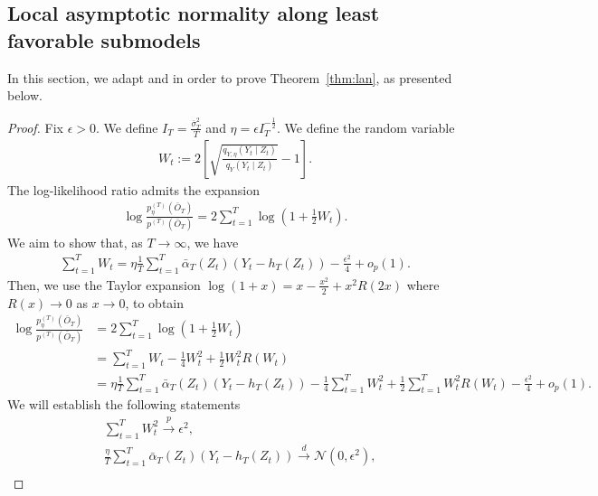 \documentclass[11pt]{article}
\begin{document}
\subsection{Local asymptotic normality along least favorable submodels}
\label{subsection: LAN}
In this section, we adapt \citet[Theorem 7.2]{vanderVaart1998asymptotic} and \citet[Theorem 17]{vanderlaan2026nonparametricinstrumentalvariableinference} in order to prove Theorem~\ref{thm:lan}, as presented below.
\begin{proof}
Fix $\epsilon >0$. We define $I_T = \frac{\bar{\sigma}_T^2}{T}$ and $\eta = \epsilon I_T^{-\frac{1}{2}}$. We define the random variable
    \begin{align*}
        W_t := 2\left[\sqrt{\frac{q_{Y, \eta}(Y_t\mid Z_t)}{q_{Y}(Y_t\mid Z_t)}} - 1\right]. 
    \end{align*}
    The log-likelihood ratio admits the expansion
    \begin{align*}
        \log \frac{p_{\eta}^{(T)}(\bar{O}_T)}{p^{(T)}(\bar{O}_T)} = 2\sum_{t=1}^{T}\log\left(1 + \frac{1}{2}W_t\right). 
    \end{align*}
    We aim to show that, as $T\to \infty$, we have
    \begin{align}
    \label{eq: wt_sum_prob}
        \sum_{t=1}^{T}W_t = \eta \frac{1}{T}\sum_{t=1}^{T}\bar{\alpha}_T(Z_t)(Y_t - h_T(Z_t)) - \frac{\epsilon^2}{4} + o_p(1). 
    \end{align}
    Then, we use the Taylor expansion $\log(1+x) = x - \frac{x^2}{2} + x^2 R(2x)$ where $R(x) \rightarrow 0$ as $x\to 0$, to obtain
    \begin{align*}
        \log \frac{p_{\eta}^{(T)}(\bar{O}_T)}{p^{(T)}(\bar{O}_T)} &= 2\sum_{t=1}^{T}\log \left(1 + \frac{1}{2}W_t\right)\\
        &= \sum_{t=1}^{T} W_t - \frac{1}{4}W_t^2 + \frac{1}{2}W_t^2R(W_t)\\
        &= \eta \frac{1}{T}\sum_{t=1}^{T}\bar{\alpha}_T(Z_t)(Y_t - h_T(Z_t)) - \frac{1}{4}\sum_{t=1}^{T}W_t^2 + \frac{1}{2}\sum_{t=1}^{T}W_t^2R(W_t) - \frac{\epsilon^2}{4} + o_p(1). 
    \end{align*}
    We will establish the following statements
    \begin{align}
        \label{eq: QV_wtsq}&\sum_{t=1}^{T}W_t^2 \overset{p}{\rightarrow} \epsilon^2, \tag{QV}\\
        \label{eq: mclt_lan_nts}&\frac{\eta}{T}\sum_{t=1}^{T}\bar{\alpha}_T(Z_t)(Y_t - h_T(Z_t)) \overset{d}{\rightarrow} \mathcal{N}(0, \epsilon^2), \tag{MCLT}\\

\end{align}
\end{proof}
\end{document}
